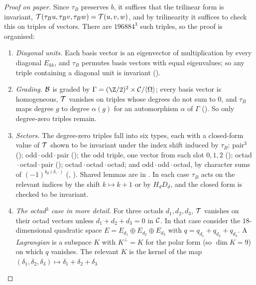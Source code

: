 \begin{proof}[Proof on paper]
Since $\tau_B$ preserves $b$, it suffices that the trilinear form is invariant,
$\mathcal{T}(\tau_Bu,\tau_Bv,\tau_Bw)=\mathcal{T}(u,v,w)$, and by trilinearity it suffices to check this on triples of
 vectors.  There are $196884^3$ such triples, so the proof is organised:
\begin{enumerate}[label=(\roman*)]
\item \emph{Diagonal units.}  Each basis vector is an eigenvector of multiplication by every diagonal
  $E_{kk}$, and $\tau_B$ permutes basis vectors with equal eigenvalues; so any triple containing a
  diagonal unit is invariant ().
\item \emph{Grading.}  $\mathcal{B}$ is graded by $\Gamma=(\Z/2)^2\times\chXXIC/\langle\Omega\rangle$; every
  basis vector is homogeneous, $\mathcal{T}$ vanishes on triples whose degrees do not sum to $0$, and $\tau_B$
  maps degree $g$ to degree $\alpha(g)$ for an automorphism $\alpha$ of $\Gamma$
  ().  So only degree-zero triples remain.
\item \emph{Sectors.}  The degree-zero triples fall into six types, each with a closed-form value of
  $\mathcal{T}$ shown to be invariant under the index shift induced by $\tau_B$: pair${}^3$
  (); odd${}\cdot{}$odd${}\cdot{}$pair
  (); the odd triple, one vector from each slot $0,1,2$
  (); octad${}\cdot{}$octad${}\cdot{}$pair
  (); octad${}\cdot{}$octad${}\cdot{}$octad; and
  odd${}\cdot{}$odd${}\cdot{}$octad, by character sums of $(-1)^{b_d(\delta,\cdot)}$
  (, ).  Shared lemmas are in
  .  In each case $\tau_B$ acts on the relevant indices by the shift
  $k\mapsto k+1$ or by $H_dD_d$, and the closed form is checked to be invariant.
\item \emph{The octad${}^3$ case in more detail.}  For three octads $d_1,d_2,d_3$, $\mathcal{T}$ vanishes on
  their octad vectors unless $d_1+d_2+d_3=0$ in $\mathcal{C}$.  In that case consider the $18$-dimensional
  quadratic space $E=E_{d_1}\oplus E_{d_2}\oplus E_{d_3}$ with $q=q_{d_1}+q_{d_2}+q_{d_3}$.  A
  \emph{Lagrangian} is a subspace $K$ with $K^\perp=K$ for the polar form (so $\dim K=9$) on which $q$
  vanishes.  The relevant $K$ is the kernel of the map $(\delta_1,\delta_2,\delta_3)\mapsto\delta_1+\delta_2+\delta_3$

\end{enumerate}
\end{proof}
